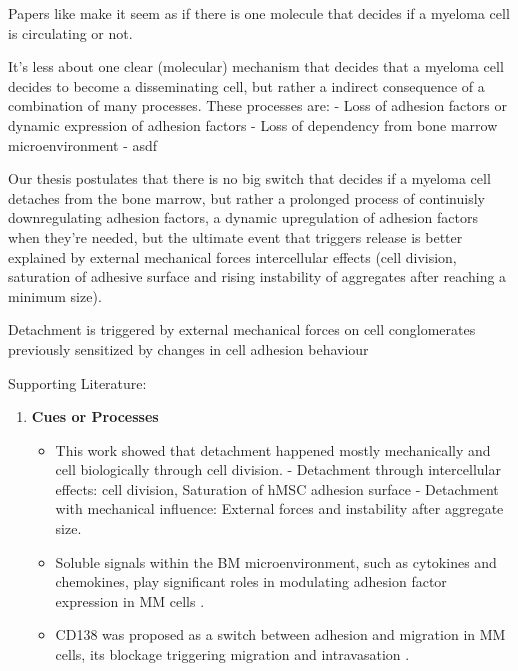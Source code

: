 Papers like \citet{akhmetzyanovaDynamicCD138Surface2020} make it seem as if
there is one molecule that decides if a myeloma cell is circulating or not.

It's less about one clear (molecular) mechanism that decides that a myeloma cell
decides to become a disseminating cell, but rather a indirect consequence of a
combination of many processes.
These processes are:
- Loss of adhesion factors or dynamic expression of adhesion factors
- Loss of dependency from bone marrow microenvironment
- asdf

Our thesis postulates that there is no big switch that decides if a myeloma cell
detaches from the bone marrow, but rather a prolonged process of continuisly
downregulating adhesion factors, a dynamic upregulation of adhesion factors when
they're needed, but the ultimate event that triggers release is better
explained by external mechanical forces intercellular effects (cell division,
saturation of adhesive surface and rising instability of aggregates after
reaching a minimum size).

Detachment is triggered by external mechanical forces on cell
conglomerates previously sensitized by changes in cell adhesion behaviour

Supporting Literature:

\begin{enumerate}
      \item \textbf{Cues or Processes}
            \begin{itemize}
                  \item This work showed that detachment happened mostly
                        mechanically and cell biologically through cell
                        division. - Detachment through intercellular effects:
                        cell division, Saturation of hMSC adhesion surface -
                        Detachment with mechanical influence: External forces
                        and instability after aggregate size.
                  \item Soluble signals within the BM microenvironment, such as
                        cytokines and chemokines, play significant roles in
                        modulating adhesion factor expression in MM cells
                        \cite{aggarwalChemokinesMultipleMyeloma2006,
                              alsayedMechanismsRegulationCXCR42007}.
                  \item CD138 was proposed as a switch between adhesion and
                        migration in MM cells, its blockage triggering migration
                        and intravasation
                        \cite{akhmetzyanovaDynamicCD138Surface2020}.
            \end{itemize}
\end{enumerate}



